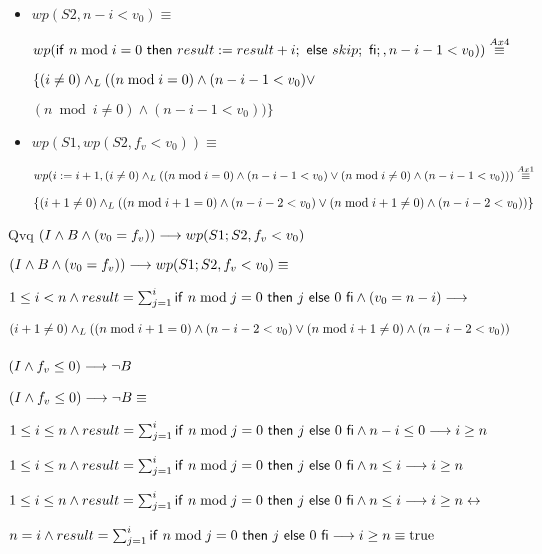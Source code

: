 \documentclass{article}
\begin{document}
\begin{itemize}
    \item $wp(S2, n-i<v_{0}) \equiv$
    
    $ wp(\mathsf{if}\ n \bmod i = 0\ \mathsf{then}\ result:= result + i;\ \mathsf{else}\ skip;\ \mathsf{fi};, n-i-1<v_{0})) \stackrel{Ax4}{\equiv}$

    $\{(i \neq 0) \land _L ((n \bmod i = 0) \wedge (n-i-1<v_{0}) \vee$

    $ (n \bmod i \neq 0 ) \wedge (n-i-1<v_{0}))\}$

    \item $wp(S1, wp(S2, f_{v} < v_{0})) \equiv$

    $wp(i := i + 1, (i \neq 0) \land _L ((n \bmod i = 0) \wedge (n-i-1<v_{0}) \vee (n \bmod i \neq 0 ) \wedge (n-i-1<v_{0}))) \stackrel{Ax1}{\equiv}$

    $\{(i + 1 \neq 0) \land _L ((n \bmod i + 1 = 0) \wedge (n-i-2<v_{0}) \vee (n \bmod i+1 \neq 0 ) \wedge (n-i-2<v_{0}))\}$

\end{itemize}

Qvq $(I \wedge B \wedge (v_{0} = f_{v})) \longrightarrow wp(S1;S2, f_{v} < v_{0})$

$(I \wedge B \wedge (v_{0} = f_{v})) \longrightarrow wp(S1;S2, f_{v} < v_{0}) \equiv$

$1 \leq i < n \wedge result = \sum_{j=1}^{i} \mathsf{if}\ n \bmod j = 0\ \mathsf{then}\ j\ \mathsf{else}\ 0\ \mathsf{fi} \wedge (v_{0} = n-i)\longrightarrow$

$(i + 1 \neq 0) \land _L ((n \bmod i + 1 = 0) \wedge (n-i-2<v_{0}) \vee (n \bmod i+1 \neq 0 ) \wedge (n-i-2<v_{0}))$

\subsubsection*{$(I \wedge f_{v} \leq 0) \longrightarrow \neg B$}

$(I \wedge f_{v} \leq 0) \longrightarrow \neg B \equiv $

$1 \leq i \leq n \wedge result = \sum_{j=1}^{i} \mathsf{if}\ n \bmod j = 0\ \mathsf{then}\ j\ \mathsf{else}\ 0\ \mathsf{fi} \wedge n-i \leq 0 \longrightarrow i \geq n$

$1 \leq i \leq n \wedge result = \sum_{j=1}^{i} \mathsf{if}\ n \bmod j = 0\ \mathsf{then}\ j\ \mathsf{else}\ 0\ \mathsf{fi} \wedge n \leq i \longrightarrow i \geq n$

$1 \leq i \leq n \wedge result = \sum_{j=1}^{i} \mathsf{if}\ n \bmod j = 0\ \mathsf{then}\ j\ \mathsf{else}\ 0\ \mathsf{fi} \wedge n \leq i \longrightarrow i \geq n\leftrightarrow$

$n = i \wedge result = \sum_{j=1}^{i} \mathsf{if}\ n \bmod j = 0\ \mathsf{then}\ j\ \mathsf{else}\ 0\ \mathsf{fi} \longrightarrow i \geq n \equiv \mathrm{true}$
\end{document}
